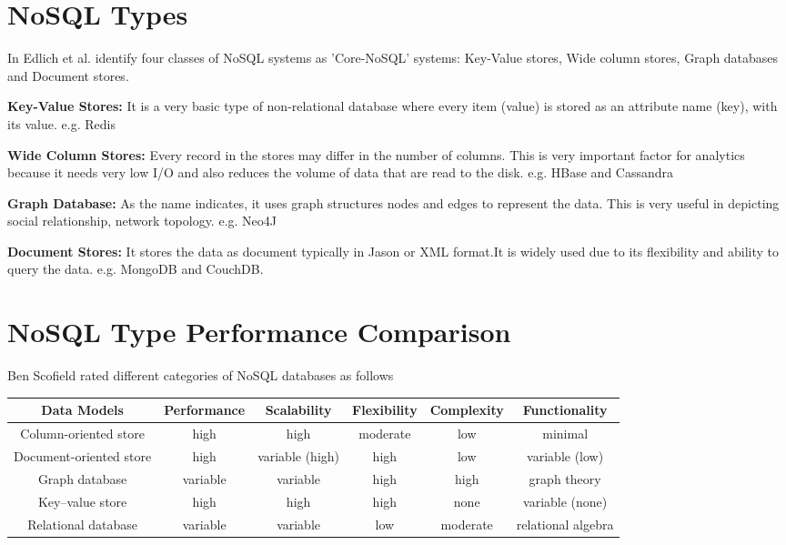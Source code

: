 \documentclass[sigconf]{acmart}
\begin{document}
\section{NoSQL Types}
In \cite{edmodel} Edlich et al. identify four classes of NoSQL systems as 'Core-NoSQL' systems: Key-Value stores, Wide column stores, Graph databases and Document stores.	

\textbf{Key-Value Stores:} It is a very basic type of non-relational database where every item (value) is stored as an attribute name (key), with its value. e.g. Redis

\textbf{Wide Column Stores:} Every record in the stores may differ in the number of columns. This is very important factor for analytics because it needs very low I/O and also reduces the volume of data that are read to the disk. e.g. HBase and Cassandra

\textbf{Graph Database:} As the name indicates, it uses graph structures nodes and edges to represent the data. This is very useful in depicting social relationship, network topology. e.g. Neo4J 

\textbf{Document Stores: }It stores the data as document typically in Jason or XML format.It is widely used due to its flexibility and ability to query the data. e.g. MongoDB and CouchDB.

\section{NoSQL Type Performance Comparison}
 Ben Scofield rated different categories of NoSQL databases as follows \cite{benrdbms}
 
\begin{center}
\begin{adjustbox}{width=10cm\textwidth}
\small
\begin{tabular}{|c{1cm}|c{1cm}|c{1cm}|c{1cm}|c{1cm}|c{1cm}| }
    \hline
        Data Models & Performance & Scalability & Flexibility & Complexity & Functionality \\ 
    \hline\hline
        Column-oriented store & high & high & moderate & low & minimal \\
    \hline
        Document-oriented store & high & variable (high) & high & low & variable (low) \\
    \hline
        Graph database & variable & variable & high & high & graph theory \\
    \hline
        Key–value store & high & high & high & none & variable (none) \\
    \hline    
        Relational database & variable & variable & low & moderate & relational algebra \\
    \hline
\end{tabular}
\end{adjustbox}
\end{center}
\end{document}
